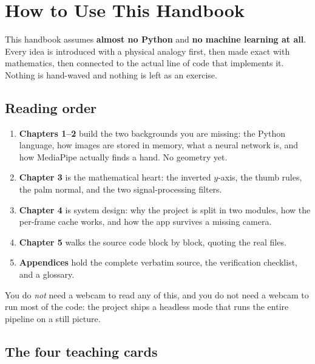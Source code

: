 \documentclass[11pt,a4paper,oneside]{report}
\newcommand{\code}[1]{\texttt{\small\detokenize{#1}}}
\begin{document}
\clearpage

\chapter*{How to Use This Handbook}

This handbook assumes \textbf{almost no Python} and \textbf{no machine learning at all}. Every idea
is introduced with a physical analogy first, then made exact with mathematics, then connected to the
actual line of code that implements it. Nothing is hand-waved and nothing is left as an exercise.

\section*{Reading order}

\begin{enumerate}
  \item \textbf{Chapters 1--2} build the two backgrounds you are missing: the Python language, how
        images are stored in memory, what a neural network is, and how MediaPipe actually finds a
        hand. No geometry yet.
  \item \textbf{Chapter 3} is the mathematical heart: the inverted $y$-axis, the thumb rules, the
        palm normal, and the two signal-processing filters.
  \item \textbf{Chapter 4} is system design: why the project is split in two modules, how the
        per-frame cache works, and how the app survives a missing camera.
  \item \textbf{Chapter 5} walks the source code block by block, quoting the real files.
  \item \textbf{Appendices} hold the complete verbatim source, the verification checklist, and a
        glossary.
\end{enumerate}

You do \emph{not} need a webcam to read any of this, and you do not need a webcam to run most of the
code: the project ships a headless \code{--image} mode that runs the entire pipeline on a still
picture.

\section*{The four teaching cards}
\end{document}
